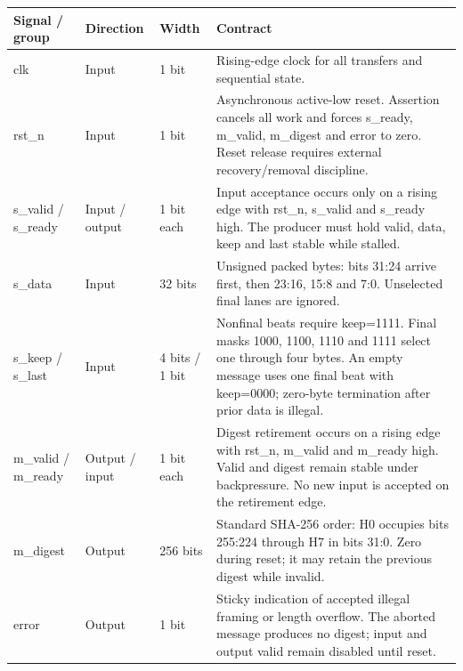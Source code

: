 \documentclass[11pt,a4paper]{article}
\begin{document}
{\small\renewcommand{\arraystretch}{1.18}\begin{longtable}{@{}L{0.21\textwidth}|L{0.12\textwidth}|L{0.12\textwidth}|L{0.45\textwidth}@{}}\toprule

\textbf{Signal /\allowbreak{} group} & \textbf{Direction} & \textbf{Width} & \textbf{Contract}\\\midrule\endhead

clk & Input & 1 bit & Rising-edge clock for all transfers and sequential state.\\[2pt]\hline

rst\_\allowbreak{}n & Input & 1 bit & Asynchronous active-low reset. Assertion cancels all work and forces s\_\allowbreak{}ready,\allowbreak{} m\_\allowbreak{}valid,\allowbreak{} m\_\allowbreak{}digest and error to zero. Reset release requires external recovery/\allowbreak{}removal discipline.\\[2pt]\hline

s\_\allowbreak{}valid /\allowbreak{} s\_\allowbreak{}ready & Input /\allowbreak{} output & 1 bit each & Input acceptance occurs only on a rising edge with rst\_\allowbreak{}n,\allowbreak{} s\_\allowbreak{}valid and s\_\allowbreak{}ready high. The producer must hold valid,\allowbreak{} data,\allowbreak{} keep and last stable while stalled.\\[2pt]\hline

s\_\allowbreak{}data & Input & 32 bits & Unsigned packed bytes: bits 31:24 arrive first,\allowbreak{} then 23:16,\allowbreak{} 15:8 and 7:0. Unselected final lanes are ignored.\\[2pt]\hline

s\_\allowbreak{}keep /\allowbreak{} s\_\allowbreak{}last & Input & 4 bits /\allowbreak{} 1 bit & Nonfinal beats require keep=\allowbreak{}1111. Final masks 1000,\allowbreak{} 1100,\allowbreak{} 1110 and 1111 select one through four bytes. An empty message uses one final beat with keep=\allowbreak{}0000; zero-byte termination after prior data is illegal.\\[2pt]\hline

m\_\allowbreak{}valid /\allowbreak{} m\_\allowbreak{}ready & Output /\allowbreak{} input & 1 bit each & Digest retirement occurs on a rising edge with rst\_\allowbreak{}n,\allowbreak{} m\_\allowbreak{}valid and m\_\allowbreak{}ready high. Valid and digest remain stable under backpressure. No new input is accepted on the retirement edge.\\[2pt]\hline

m\_\allowbreak{}digest & Output & 256 bits & Standard SHA-256 order: H0 occupies bits 255:224 through H7 in bits 31:0. Zero during reset; it may retain the previous digest while invalid.\\[2pt]\hline

error & Output & 1 bit & Sticky indication of accepted illegal framing or length overflow. The aborted message produces no digest; input and output valid remain disabled until reset.\\[2pt]\hline

\bottomrule\end{longtable}}
\end{document}
